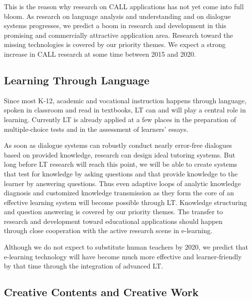 \documentclass[10pt, plain]{../../metanetpaper}
\begin{document}
\begin{multicols}{2}
This is the reason why research on CALL applications has not yet come into full bloom. As research on language analysis and understanding and on dialogue systems progresses, we predict a boom in research and development in this promising and commercially attractive application area. Research toward the missing technologies is covered by our priority themes. We expect a strong increase in CALL research at some time between 2015 and 2020.

\subsection{Learning Through Language}
\label{sec:learn-thro-lang}

Since most K-12, academic and vocational instruction happens through language, spoken in classroom and read in textbooks, LT can and will play a central role in learning. Currently LT is already applied at a few places in the preparation of multiple-choice tests and in the assessment of learners’ essays.
 
As soon as dialogue systems can robustly conduct nearly error-free dialogues based on provided knowledge, research can design ideal tutoring systems. But long before LT research will reach this point, we will be able to create systems that test for knowledge by asking questions and that provide knowledge to the learner by answering questions. Thus even adaptive loops of analytic knowledge diagnosis and customized knowledge transmission as they form the core of an effective learning system will become possible through LT. Knowledge structuring and question answering is covered by our priority themes. The transfer to research and development toward educational applications should happen through close cooperation with the active research scene in e-learning.
 
Although we do not expect to substitute human teachers by 2020, we predict that e-learning technology will have become much more effective and learner-friendly by that time through the integration of advanced LT.

\subsection{Creative Contents and Creative Work}
\label{sec:lt-creative-contents}


\end{multicols}
\end{document}
